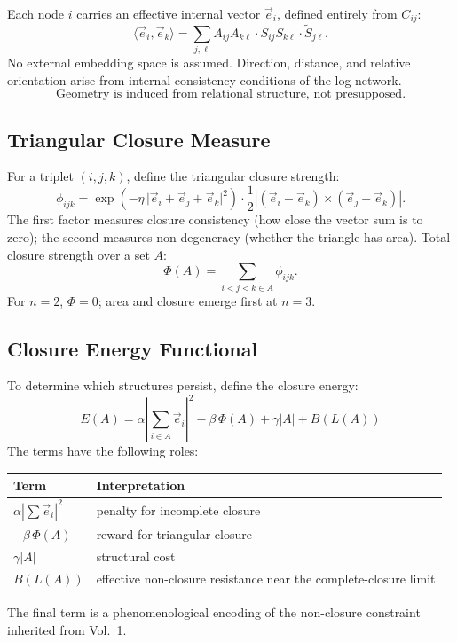 Each node $i$ carries an effective internal vector $\vec{e}_i$,
defined entirely from $C_{ij}$:
\begin{equation}
  \langle \vec{e}_i, \vec{e}_k \rangle
  = \sum_{j,\ell} A_{ij} A_{k\ell} \cdot S_{ij} S_{k\ell} \cdot \tilde{S}_{j\ell}.
\end{equation}
No external embedding space is assumed.
Direction, distance, and relative orientation arise from internal
consistency conditions of the log network.
\begin{equation}
  \boxed{\text{Geometry is induced from relational structure, not presupposed.}}
\end{equation}

\subsection{Triangular Closure Measure}

For a triplet $(i,j,k)$, define the triangular closure strength:
\begin{equation}
  \phi_{ijk}
  = \exp\!\left(-\eta\,\bigl|\vec{e}_i+\vec{e}_j+\vec{e}_k\bigr|^2\right)
  \cdot \frac{1}{2}
  \left|(\vec{e}_i-\vec{e}_k)\times(\vec{e}_j-\vec{e}_k)\right|.
\end{equation}
The first factor measures closure consistency (how close the vector sum is to zero);
the second measures non-degeneracy (whether the triangle has area).
Total closure strength over a set $A$:
\begin{equation}
  \Phi(A) = \sum_{i<j<k \in A} \phi_{ijk}.
\end{equation}
For $n=2$, $\Phi = 0$; area and closure emerge first at $n=3$.

\subsection{Closure Energy Functional}

To determine which structures persist, define the closure energy:
\begin{equation}
  \label{eq:closure_energy}
  \boxed{
    E(A)
    = \alpha \left|\sum_{i\in A}\vec{e}_i\right|^2
    - \beta\,\Phi(A)
    + \gamma|A|
    + B(L(A))
  }
\end{equation}
The terms have the following roles:
\begin{center}
\begin{tabular}{ll}
\toprule
Term & Interpretation \\
\midrule
$\alpha|\sum\vec{e}_i|^2$ & penalty for incomplete closure \\
$-\beta\,\Phi(A)$ & reward for triangular closure \\
$\gamma|A|$ & structural cost \\
$B(L(A))$ & effective non-closure resistance near the complete-closure limit \\
\bottomrule
\end{tabular}
\end{center}
The final term is a phenomenological encoding of the non-closure constraint
inherited from Vol.~1.

